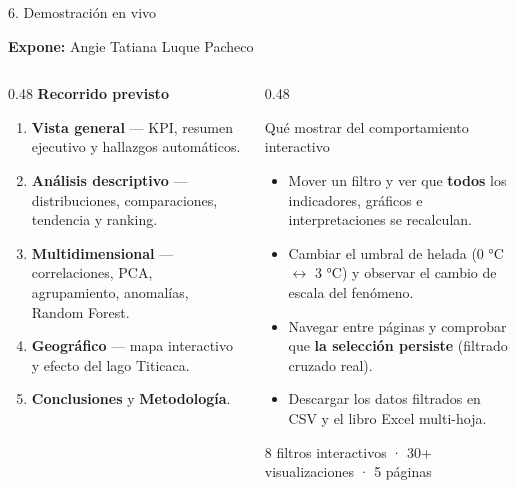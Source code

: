 \documentclass[aspectratio=169,11pt]{beamer}
\newcommand{\ponente}[1]{%
  \begin{flushright}\tiny\textcolor{pnBrandDark}{\textbf{Expone:} #1}\end{flushright}%
  \vspace{-0.9em}%
}
\begin{document}
\begin{frame}{6. Demostración en vivo}
  \ponente{Angie Tatiana Luque Pacheco}
  \small
  \begin{columns}[T]
    \begin{column}{0.48\textwidth}
      \textbf{Recorrido previsto}
      \begin{enumerate}\itemsep0.3em
        \item \textbf{Vista general} — KPI, resumen ejecutivo y hallazgos automáticos.
        \item \textbf{Análisis descriptivo} — distribuciones, comparaciones, tendencia y ranking.
        \item \textbf{Multidimensional} — correlaciones, PCA, agrupamiento, anomalías, Random Forest.
        \item \textbf{Geográfico} — mapa interactivo y efecto del lago Titicaca.
        \item \textbf{Conclusiones} y \textbf{Metodología}.
      \end{enumerate}
    \end{column}
    \begin{column}{0.48\textwidth}
      \begin{block}{Qué mostrar del comportamiento interactivo}
        \scriptsize
        \begin{itemize}\itemsep0.15em
          \item Mover un filtro y ver que \textbf{todos} los indicadores, gráficos e
                interpretaciones se recalculan.
          \item Cambiar el umbral de helada (0 °C $\leftrightarrow$ 3 °C) y observar el cambio de escala del fenómeno.
          \item Navegar entre páginas y comprobar que \textbf{la selección persiste}
                (filtrado cruzado real).
          \item Descargar los datos filtrados en CSV y el libro Excel multi-hoja.
        \end{itemize}
      \end{block}
      \vspace{0.2em}
      {\scriptsize\textcolor{pnInkSoft}{8 filtros interactivos · 30+ visualizaciones · 5 páginas}}
    \end{column}
  \end{columns}
\end{frame}
\end{document}
